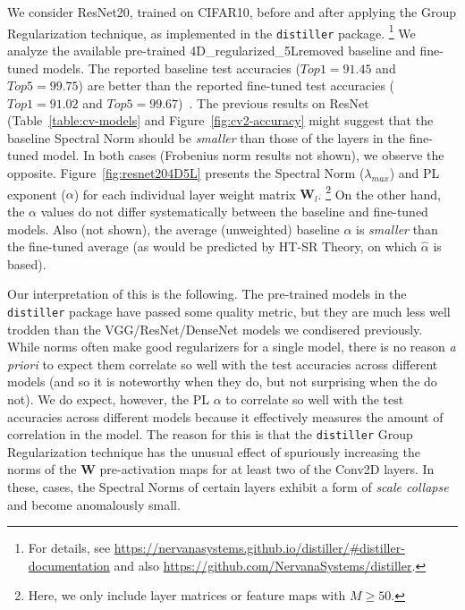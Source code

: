 We consider ResNet20, trained on CIFAR10, before and after applying the Group Regularization technique, as implemented in the \texttt{distiller} package.%
\footnote{For details, see \url{https://nervanasystems.github.io/distiller/\#distiller-documentation} and also \url{https://github.com/NervanaSystems/distiller}.}
We analyze the available pre-trained 4D\_regularized\_5Lremoved baseline and fine-tuned models.  %
The reported baseline test accuracies ($Top1=91.45$ and $Top5=99.75$) are better than the reported fine-tuned test accuracies ($Top1=91.02$ and $Top5=99.67$)~\cite{XXX-XXX}.
The previous results on ResNet (Table~\ref{table:cv-models} and Figure~\ref{fig:cv2-accuracy} might suggest that the baseline Spectral Norm should be \emph{smaller} than those of the layers in the fine-tuned model.
In both cases (Frobenius norm results not shown), we observe the opposite.
Figure~\ref{fig:resnet204D5L} presents the Spectral Norm ($\lambda_{max}$) and PL exponent ($\alpha$) for each individual layer weight matrix $\mathbf{W}_{l}$.%
\footnote{Here, we only include layer matrices or feature maps with $M\ge50$.}
On the other hand, the $\alpha$ values do not differ systematically between the baseline and fine-tuned models.
Also (not shown), the average (unweighted) baseline $\alpha$ is \emph{smaller} than the fine-tuned average (as would be predicted by HT-SR Theory, on which $\hat{\alpha}$ is based).


Our interpretation of this is the following.
The pre-trained models in the \texttt{distiller} package have passed some quality metric, but they are much less well trodden than 
the VGG/ResNet/DenseNet models we condisered previously.
While norms often make good regularizers for a single model, there is no reason \emph{a priori} to expect them correlate so well with the test accuracies across different models (and so it is noteworthy when they do, but not surprising when the do not).
We do expect, however, the PL $\alpha$ to correlate so well with the test accuracies across different models because it effectively measures the amount of correlation in the model.
%
The reason for this is that the \texttt{distiller} Group Regularization technique has the unusual effect of spuriously increasing the norms of the $\mathbf{W}$ pre-activation maps for at least two of the Conv2D layers.
In these, cases, the Spectral Norms of certain layers exhibit a form of \emph{scale collapse} and become anomalously small.


